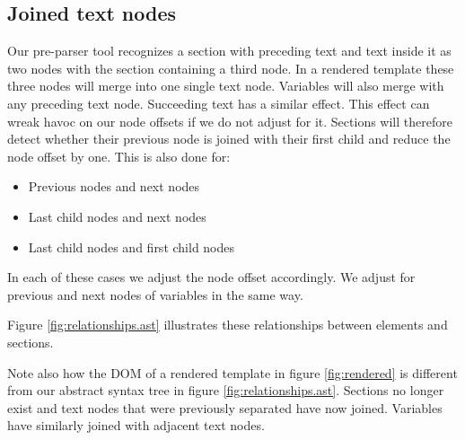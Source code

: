 \documentclass[thesis.tex]{subfiles}
\begin{document}
\subsection{Joined text nodes}
\label{sec:joined}
Our pre-parser tool recognizes a section with preceding text and text inside it
as two nodes with the section containing a third node. In a rendered template
these three nodes will merge into one single text node. Variables will also
merge with any preceding text node. Succeeding text has a similar effect.
This effect can wreak havoc on our node offsets if we do not adjust for it.
Sections will therefore detect whether their previous node is joined with
their first child and reduce the node offset by one. This is also done for:
\begin{itemize}
\item Previous nodes and next nodes
\item Last child nodes and next nodes
\item Last child nodes and first child nodes
\end{itemize}
In each of these cases we adjust the node offset accordingly. We adjust
for previous and next nodes of variables in the same way.

Figure \ref{fig:relationships.ast} illustrates these relationships between elements
and sections.

Note also how the DOM of a rendered template in figure \ref{fig:rendered} is
different from our abstract syntax tree in figure \ref{fig:relationships.ast}.
Sections no longer exist and text nodes that were previously separated have now joined.
Variables have similarly joined with adjacent text nodes.
\end{document}
